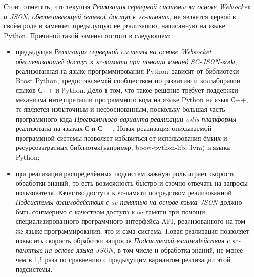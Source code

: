Стоит отметить, что текущая \textit{Реализация серверной системы на основе Websocket и JSON, обеспечивающей сетевой доступ к sc-памяти}, не является первой в своём роде и заменяет предыдущую ее реализацию, написанную на языке Python.
Причиной такой замены состоит в следующем:
\begin{itemize}
    \item предыдущая \textit{Реализация серверной системы на основе Websocket, обеспечивающей доступ к sc-памяти при помощи команд SC-JSON-кода}, реализованная на языке программирования Python, зависит от библиотеки Boost Python, предоставляемой сообществом по развитию и коллаборации языков С++ и Python. Дело в том, что такое решение требует поддержки механизма интерпретации программного кода на языке Python на язык С++, то является избыточным и необоснованным, поскольку большая часть программного кода \textit{Программного варианта реализации ostis-платформы} реализована на языках С и С++. Новая реализация описываемой программной системы позволяет избавиться от использования ёмких и ресурсозатратных библиотек(например, boost-python-lib, llvm) и языка Python;
    \item при реализации распределённых подсистем важную роль играет скорость обработки знаний, то есть возможность быстро и срочно отвечать на запросы пользователя. Качество доступа к sc-памяти посредством реализованной \textit{Подсистемы взаимодействия с sc-памятью на основе языка JSON} должно быть соизмеримо с качеством доступа к sc-памяти при помощи специализированного программного интерфейса API, реализованного на том же языке программирования, что и сама система. Новая реализация позволяет повысить скорость обработки запросов \textit{Подсистемой взаимодействия с sc-памятью на основе языка JSON}, в том числе и обработка знаний, не менее чем в 1,5 раза по сравнению с предыдущим вариантом реализации этой подсистемы.
\end{itemize}

